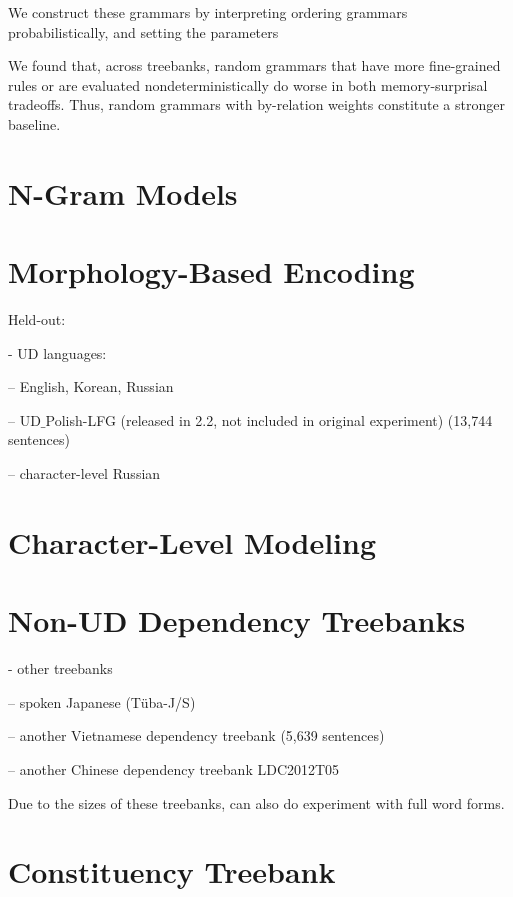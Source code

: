 \documentclass[11pt,letterpaper]{article}
\begin{document}
We construct these grammars by interpreting ordering grammars probabilistically, and setting the parameters 


We found that, across treebanks, random grammars that have more fine-grained rules or are evaluated nondeterministically do worse in both memory-surprisal tradeoffs.
Thus, random grammars with by-relation weights constitute a stronger baseline.



\section{N-Gram Models}



\section{Morphology-Based Encoding}



Held-out:

- UD languages:

-- English, Korean, Russian

-- UD$\_$Polish-LFG (released in 2.2, not included in original experiment) (13,744 sentences)

-- character-level Russian




\section{Character-Level Modeling}

\section{Non-UD Dependency Treebanks}



- other treebanks



-- spoken Japanese (T{\"u}ba-J/S)

-- another Vietnamese dependency treebank \citep{nguyen-bktreebank:-2017} (5,639 sentences)


-- another Chinese dependency treebank LDC2012T05


Due to the sizes of these treebanks, can also do experiment with full word forms.


\section{Constituency Treebank}
\end{document}
